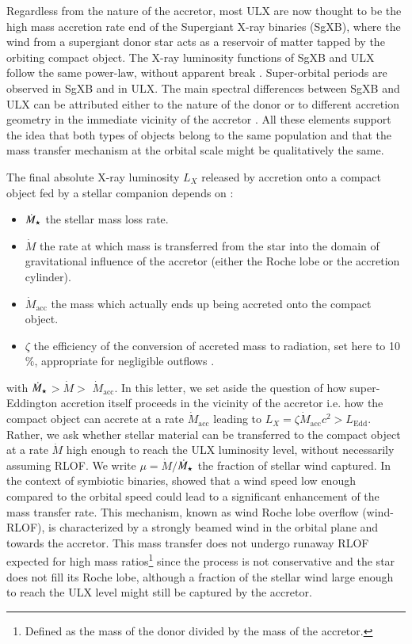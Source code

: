 \documentclass[letter]{aa}
\makeatletter
\newcommand{\sgx}{SgXB\xspace}
\newcommand{\ulx}{ULX\xspace}
\newcommand*{\rlof}{RLOF\@\xspace}
\newcommand*{\ie}{i.e.\@\xspace}
\newcommand{\mystar}{{\fontfamily{lmr}\selectfont$\star$}}
\newcommand*{\mdotstar}{$\dot{M}_{\text{\mystar}}$\@\xspace}
\newcommand*{\mdotacc}{$\dot{M}_{\text{acc}}$\@\xspace}
\newcommand*{\ledd}{$L_{\text{Edd}}$\@\xspace}
\makeatother
\begin{document}
Regardless from the nature of the accretor, most ULX are now thought to be the high mass accretion rate end of the Supergiant X-ray binaries (\sgx), where the wind from a supergiant donor star acts as a reservoir of matter tapped by the orbiting compact object. The X-ray luminosity functions of \sgx and \ulx follow the same power-law, without apparent break \citep{Gilfanov2004,Swartz2011}. Super-orbital periods are observed in \sgx \citep{Corbet2013} and in \ulx \citep{Walton2016,Fuerst2018}. The main spectral differences between \sgx and \ulx can be attributed either to the nature of the donor or to different accretion geometry in the immediate vicinity of the accretor \citep{Kaaret2017}. All these elements support the idea that both types of objects belong to the same population and that the mass transfer mechanism at the orbital scale might be qualitatively the same.

The final absolute X-ray luminosity $L_X$ released by accretion onto a compact object fed by a stellar companion depends on :
\begin{itemize}
\item \mdotstar the stellar mass loss rate.
\item $\dot{M}$ the rate at which mass is transferred from the star into the domain of gravitational influence of the accretor (either the Roche lobe or the accretion cylinder).
\item \mdotacc the mass which actually ends up being accreted onto the compact object.
\item $\zeta$ the efficiency of the conversion of accreted mass to radiation, set here to 10$\%$, appropriate for negligible outflows \citep{Kaaret2017}.
\end{itemize} 
with \mdotstar $>\dot{M}>$ \mdotacc. In this letter, we set aside the question of how super-Eddington accretion itself proceeds in the vicinity of the accretor \ie how the compact object can accrete at a rate \mdotacc leading to $L_X=\zeta$\mdotacc$c^2>$\ledd. Rather, we ask whether stellar material can be transferred to the compact object at a rate $\dot{M}$ high enough to reach the ULX luminosity level, without necessarily assuming \rlof. We write $\mu=\dot{M}/$\mdotstar the fraction of stellar wind captured. In the context of symbiotic binaries, \cite{Mohamed2007} showed that a wind speed low enough compared to the orbital speed could lead to a significant enhancement of the mass transfer rate. This mechanism, known as wind Roche lobe overflow (wind-\rlof), is characterized by a strongly beamed wind in the orbital plane and towards the accretor. This mass transfer does not undergo runaway \rlof expected for high mass ratios\footnote{Defined as the mass of the donor divided by the mass of the accretor.} since the process is not conservative and the star does not fill its Roche lobe, although a fraction of the stellar wind large enough to reach the \ulx level might still be captured by the accretor.
\end{document}
